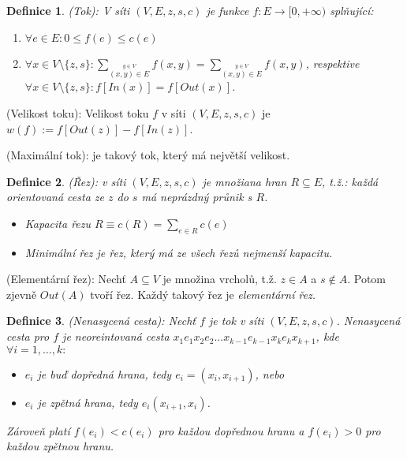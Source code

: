 \documentclass[10pt,a4paper]{article}
\newtheorem{definice}{Definice}
\begin{document}
\begin{definice} (Tok): \normalfont
    V síti $(V, E, z, s, c)$ je funkce $f: E\to [0, +\infty)$ splňující: \begin{enumerate}[label=(\roman*)]
        \item $\forall e \in E: 0 \leq f(e) \leq c(e)$
        \item $\forall x \in V\setminus\{z,s\}: \displaystyle \sum_{\stackrel{y\in V}{(x,y)\in E}}f(x,y) = \sum_{\stackrel{y\in V}{(x,y)\in E}}f(x,y)$, respektive $\forall x \in V\setminus\{z,s\}: f[In(x)] = f[Out(x)]$.
    \end{enumerate}
\end{definice}

 (Velikost toku): \normalfont Velikost toku $f$ v síti $(V, E, z,s,c)$ je $w(f):= f[Out(z)] - f[In(z)]$.

 (Maximální tok): \normalfont je takový tok, který má největší velikost.

\begin{definice} (Řez): \normalfont 
    v síti $(V, E, z,s,c)$ je množiana hran $R \subseteq E$, t.ž.: každá orientovaná cesta ze $z$ do $s$ má neprázdný průnik s $R$.
    \begin{itemize}
        \item \textit{Kapacita} řezu $\displaystyle R \equiv c(R) = \sum_{e\in R}c(e)$
        \item \textit{Minimální} řez je řez, který má ze všech řezů nejmenší kapacitu.
    \end{itemize}
\end{definice}
 (Elementární řez): \normalfont Nechť $A\subseteq V$ je množina vrcholů, t.ž. $z\in A$ a $s \notin A$. Potom zjevně $Out(A)$ tvoří řez. Každý takový řez je \textit{elementární řez.}

\begin{definice} (Nenasycená cesta): \normalfont Nechť $f$ je tok v síti $(V, E, z, s, c)$. 
    \textit{Nenasycená cesta} pro $f$ je neoreintovaná cesta $x_1e_1 x_2e_2\ldots x_{k-1}e_{k-1} x_ke_k x_{k+1}$, kde $\forall i = 1, \ldots, k: $ 
    \begin{itemize}
        \item $e_i$ je buď \textit{dopředná hrana}, tedy $e_i = (x_i, x_{i+1})$, nebo 
        \item $e_i$ je \textit{zpětná hrana}, tedy $e_i(x_{i+1}, x_i)$.
    \end{itemize}
    Zároveň platí $f(e_i) < c(e_i)$ pro každou dopřednou hranu a $f(e_i) > 0$ pro každou zpětnou hranu.
\end{definice}
\end{document}
